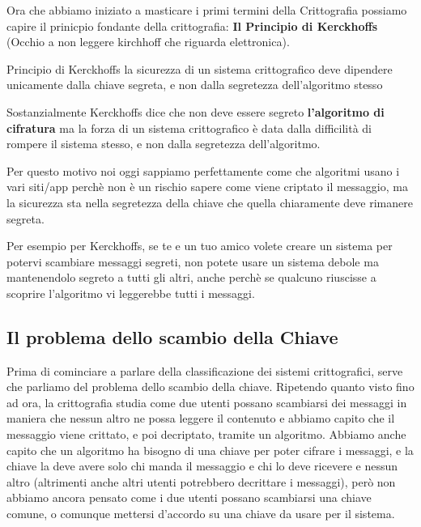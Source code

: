 \documentclass{report}
\begin{document}
Ora che abbiamo iniziato a masticare i primi termini della Crittografia possiamo capire il prinicpio fondante della crittografia: \textbf{Il Principio di Kerckhoffs} (Occhio a non leggere kirchhoff che riguarda elettronica).

\begin{teorema}{Principio di Kerckhoffs}{}
la sicurezza di un sistema crittografico deve dipendere unicamente dalla chiave segreta, e non dalla segretezza dell'algoritmo stesso
\end{teorema}

Sostanzialmente Kerckhoffs dice che non deve essere segreto \textbf{l'algoritmo di cifratura} ma la forza di un sistema crittografico è data dalla difficilità di rompere il sistema stesso, e non dalla segretezza dell'algoritmo.

Per questo motivo noi oggi sappiamo perfettamente come che algoritmi usano i vari siti/app perchè non è un rischio sapere come viene criptato il messaggio, ma la sicurezza sta nella segretezza della chiave che quella chiaramente deve rimanere segreta.

Per esempio per Kerckhoffs, se te e un tuo amico volete creare un sistema per potervi scambiare messaggi segreti, non potete usare un sistema debole ma mantenendolo segreto a tutti gli altri, anche perchè se qualcuno riuscisse a scoprire l'algoritmo vi leggerebbe tutti i messaggi.




\subsection{Il problema dello scambio della Chiave}

Prima di cominciare a parlare della classificazione dei sistemi crittografici, serve che parliamo del problema dello scambio della chiave. Ripetendo quanto visto fino ad ora, la crittografia studia come due utenti possano scambiarsi dei messaggi in maniera che nessun altro ne possa leggere il contenuto e abbiamo capito che il messaggio viene crittato, e poi decriptato, tramite un algoritmo. Abbiamo anche capito che un algoritmo ha bisogno di una chiave per poter cifrare i messaggi, e la chiave la deve avere solo chi manda il messaggio e chi lo deve ricevere e nessun altro (altrimenti anche altri utenti potrebbero decrittare i messaggi), però non abbiamo ancora pensato come i due utenti possano scambiarsi una chiave comune, o comunque mettersi d'accordo su una chiave da usare per il sistema.
\end{document}
